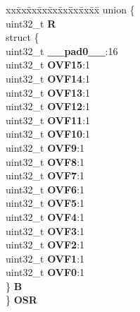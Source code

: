 \begin{DoxyCompactItemize}
\begin{tabbing}
\end{tabbing}\item 
\mbox{\label{structSIU__tag_ac7385127a76e4b0f529d3d262f7c2a29}} 
\begin{tabbing}
xx\=xx\=xx\=xx\=xx\=xx\=xx\=xx\=xx\=\kill
union \{\\
\>uint32\_t {\bfseries R}\\
\>struct \{\\
\>\>uint32\_t {\bfseries \_\_pad0\_\_}:16\\
\>\>uint32\_t {\bfseries OVF15}:1\\
\>\>uint32\_t {\bfseries OVF14}:1\\
\>\>uint32\_t {\bfseries OVF13}:1\\
\>\>uint32\_t {\bfseries OVF12}:1\\
\>\>uint32\_t {\bfseries OVF11}:1\\
\>\>uint32\_t {\bfseries OVF10}:1\\
\>\>uint32\_t {\bfseries OVF9}:1\\
\>\>uint32\_t {\bfseries OVF8}:1\\
\>\>uint32\_t {\bfseries OVF7}:1\\
\>\>uint32\_t {\bfseries OVF6}:1\\
\>\>uint32\_t {\bfseries OVF5}:1\\
\>\>uint32\_t {\bfseries OVF4}:1\\
\>\>uint32\_t {\bfseries OVF3}:1\\
\>\>uint32\_t {\bfseries OVF2}:1\\
\>\>uint32\_t {\bfseries OVF1}:1\\
\>\>uint32\_t {\bfseries OVF0}:1\\
\>\} {\bfseries B}\\
\} {\bfseries OSR}\\


\end{tabbing}
\end{DoxyCompactItemize}
